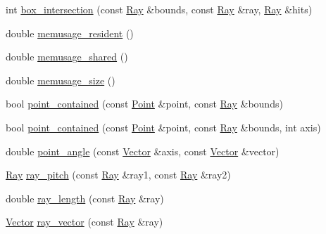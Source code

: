\begin{DoxyCompactItemize}
\item 
int \hyperlink{namespace_wire_cell_a2e8924bbcd70754adeb72b8e14f1d987}{box\+\_\+intersection} (const \hyperlink{namespace_wire_cell_a3ab20d9b438feb7eb1ffaab9ba98af0c}{Ray} \&bounds, const \hyperlink{namespace_wire_cell_a3ab20d9b438feb7eb1ffaab9ba98af0c}{Ray} \&ray, \hyperlink{namespace_wire_cell_a3ab20d9b438feb7eb1ffaab9ba98af0c}{Ray} \&hits)
\item 
double \hyperlink{namespace_wire_cell_ab9a89ef526d9db272e072e95556f6a3b}{memusage\+\_\+resident} ()
\item 
double \hyperlink{namespace_wire_cell_a4d80e4c561949f1572382e432cfb4f22}{memusage\+\_\+shared} ()
\item 
double \hyperlink{namespace_wire_cell_a079570140982516787676ec882e0f297}{memusage\+\_\+size} ()
\item 
bool \hyperlink{namespace_wire_cell_a1f164ff69a3d3df581b27e68d63236b3}{point\+\_\+contained} (const \hyperlink{namespace_wire_cell_ab2b2565fa6432efbb4513c14c988cda9}{Point} \&point, const \hyperlink{namespace_wire_cell_a3ab20d9b438feb7eb1ffaab9ba98af0c}{Ray} \&bounds)
\item 
bool \hyperlink{namespace_wire_cell_aa2cf1599ea50ce90955cd63654a957a4}{point\+\_\+contained} (const \hyperlink{namespace_wire_cell_ab2b2565fa6432efbb4513c14c988cda9}{Point} \&point, const \hyperlink{namespace_wire_cell_a3ab20d9b438feb7eb1ffaab9ba98af0c}{Ray} \&bounds, int axis)
\item 
double \hyperlink{namespace_wire_cell_a6686e72c77f10942558aacbe3383a0f0}{point\+\_\+angle} (const \hyperlink{namespace_wire_cell_aa3c82d3ba85f032b0d278b7004846800}{Vector} \&axis, const \hyperlink{namespace_wire_cell_aa3c82d3ba85f032b0d278b7004846800}{Vector} \&vector)
\item 
\hyperlink{namespace_wire_cell_a3ab20d9b438feb7eb1ffaab9ba98af0c}{Ray} \hyperlink{namespace_wire_cell_a8e3ed293f3eefafaec9f8cf97f460a9b}{ray\+\_\+pitch} (const \hyperlink{namespace_wire_cell_a3ab20d9b438feb7eb1ffaab9ba98af0c}{Ray} \&ray1, const \hyperlink{namespace_wire_cell_a3ab20d9b438feb7eb1ffaab9ba98af0c}{Ray} \&ray2)
\item 
double \hyperlink{namespace_wire_cell_a078ec264f4f9f82fe3e6ba21b2108d00}{ray\+\_\+length} (const \hyperlink{namespace_wire_cell_a3ab20d9b438feb7eb1ffaab9ba98af0c}{Ray} \&ray)
\item 
\hyperlink{namespace_wire_cell_aa3c82d3ba85f032b0d278b7004846800}{Vector} \hyperlink{namespace_wire_cell_a3e825e090f86eed7647960e8e611a144}{ray\+\_\+vector} (const \hyperlink{namespace_wire_cell_a3ab20d9b438feb7eb1ffaab9ba98af0c}{Ray} \&ray)

\end{DoxyCompactItemize}
